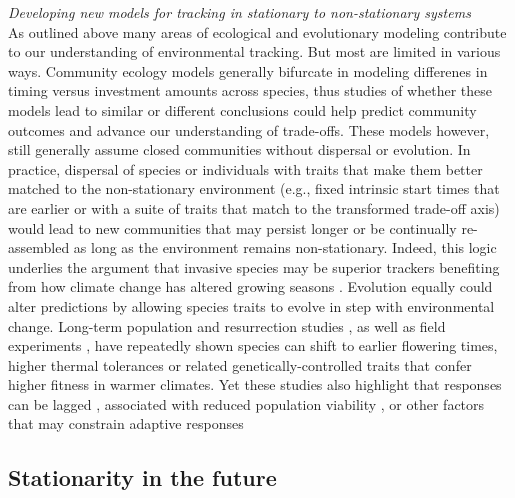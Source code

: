 \documentclass[11pt,letterpaper]{article}
\begin{document}
\emph{Developing new models for tracking in stationary to non-stationary systems} \\
As outlined above many areas of ecological and evolutionary modeling contribute to our understanding of environmental tracking. But most are limited in various ways. Community ecology models generally bifurcate in modeling differenes in timing versus investment amounts across species, thus studies of whether these models lead to similar or different conclusions could help predict community outcomes and advance our understanding of trade-offs. These models however, still generally assume closed communities without  dispersal or evolution. In practice, dispersal of species or individuals with traits that make them better matched to the non-stationary environment (e.g., fixed intrinsic start times that are earlier or with a suite of traits that match to the transformed trade-off axis) would lead to new communities that may persist longer or be continually re-assembled as long as the environment remains non-stationary. Indeed, this logic underlies the argument that invasive species may be superior trackers benefiting from how climate change has altered growing seasons \citep{Willis:2010al,wolkovich:2010fee}. Evolution equally could alter predictions by allowing species traits to evolve in step with environmental change. Long-term population \citep[e.g.,][]{colautti2017} and resurrection studies \citep{wilczek2014,yousey2018}, as well as field experiments \citep{colautti2017,arab2019}, have repeatedly shown species can shift to earlier flowering times, higher thermal tolerances or related genetically-controlled traits that confer higher fitness in warmer climates. Yet these studies also highlight that responses can be lagged \citep[e.g.,][]{wilczek2014}, associated with reduced population viability \citep[e.g.,][]{colautti2017}, or other factors that may constrain adaptive responses

\subsection{Stationarity in the future}
\end{document}
